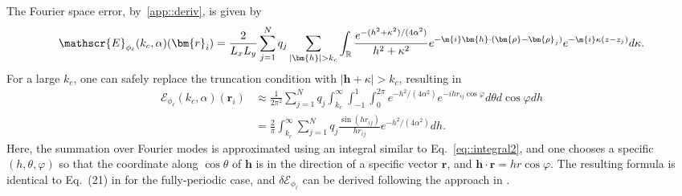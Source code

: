 The Fourier space error, by~\ref{app::deriv}, is given by
\begin{equation}
	\mathscr{E}_{\phi_{\ell}}(k_c,\alpha)(\bm{r}_{i})=\frac{2}{L_xL_y}\sum_{j=1}^{N}q_{j}\sum_{|\bm{h}|>k_c}\int_{\mathbb{R}}\frac{e^{-(h^2+\kappa^2)/(4\alpha^2)}}{h^2+\kappa^2}e^{-\m{i} \bm{h}\cdot(\bm{\rho}-\bm{\rho}_{j})}e^{-\m{i} \kappa(z-z_{j})}d\kappa.
\end{equation}
For a large $k_c$, one can safely replace the truncation condition with $|\bm{h}+\kappa|>k_c$, resulting in
\begin{equation}
	\begin{split}
		\mathscr{E}_{\phi_{\ell}}(k_c,\alpha)(\bm{r}_{i})&\approx \frac{1}{2\pi^2}\sum_{j=1}^{N}q_{j} \int_{k_c}^{\infty}\int_{-1}^{1}\int_{0}^{2\pi}e^{-h^2/(4\alpha^2)}e^{-i h r_{ij}\cos\varphi}d\theta d\cos\varphi dh\\
		&=\frac{2}{\pi}\int_{k_c}^{\infty}\sum_{j=1}^{N}q_{j}\frac{\sin(h r_{ij})}{h r_{ij}}e^{-h^2/(4\alpha^2)}dh.
	\end{split}
\end{equation}
Here, the summation over Fourier modes is approximated using an integral similar to Eq.~\eqref{eq::integral2}, and one chooses a specific $(h,\theta,\varphi)$ so that the coordinate along $\cos\theta$ of $\bm{h}$ is in the direction of a specific vector $\bm{r}$, and $\bm{h}\cdot\bm{r}=h r \cos\varphi$.
The resulting formula is identical to Eq.~(21) in \cite{kolafa1992cutoff} for the fully-periodic case, and $\delta \mathscr{E}_{\phi_{\ell}}$ can be derived following the approach in \cite{kolafa1992cutoff}. 